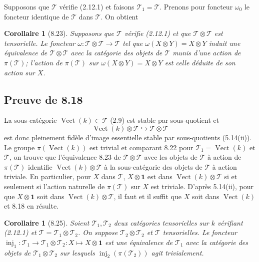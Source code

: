 \documentclass[12pt,a4paper]{article}
\theoremstyle{plain}
\newtheorem{corollary}[theorem]{Corollaire}
\theoremstyle{definition}
\DeclareMathOperator{\Vect}{Vect}
\DeclareMathOperator{\inj}{inj}
\begin{document}
Supposons que $\mathcal{T}$ vérifie (2.12.1) et faisons $\mathcal{T}_1 = \mathcal{T}$. Prenons pour foncteur $\omega_0$ le foncteur identique de $\mathcal{T}$ dans $\mathcal{T}$. On obtient
\begin{corollary}[8.23]
Supposons que $\mathcal{T}$ vérifie (2.12.1) et que $\mathcal{T} \otimes \mathcal{T}$ est tensorielle. Le foncteur $\omega : \mathcal{T} \otimes \mathcal{T} \to \mathcal{T}$ tel que $\omega(X \otimes Y) = X \otimes Y$ induit une équivalence de $\mathcal{T} \otimes \mathcal{T}$ avec la catégorie des objets de $\mathcal{T}$ munis d'une action de $\pi(\mathcal{T})$; l'action de $\pi(\mathcal{T})$ sur $\omega(X \otimes Y) = X \otimes Y$ est celle déduite de son action sur $X$.
\end{corollary}

\subsection{Preuve de 8.18}

La sous-catégorie $\Vect(k) \subset \mathcal{T}$ (2.9) est stable par sous-quotient et
\[
\Vect(k) \otimes \mathcal{T} \hookrightarrow \mathcal{T} \otimes \mathcal{T}
\]
est donc pleinement fidèle d'image essentielle stable par sous-quotients (5.14(ii)). Le groupe $\pi(\Vect(k))$ est trivial et comparant 8.22 pour $\mathcal{T}_1 = \Vect(k)$ et $\mathcal{T}$, on trouve que l'équivalence 8.23 de $\mathcal{T} \otimes \mathcal{T}$ avec les objets de $\mathcal{T}$ à action de $\pi(\mathcal{T})$ identifie $\Vect(k) \otimes \mathcal{T}$ à la sous-catégorie des objets de $\mathcal{T}$ à action triviale. En particulier, pour $X$ dans $\mathcal{T}$, $X \otimes \mathbf{1}$ est dans $\Vect(k) \otimes \mathcal{T}$ si et seulement si l'action naturelle de $\pi(\mathcal{T})$ sur $X$ est triviale. D'après 5.14(ii), pour que $X \otimes \mathbf{1}$ soit dans $\Vect(k) \otimes \mathcal{T}$, il faut et il suffit que $X$ soit dans $\Vect(k)$ et 8.18 en résulte.

\begin{corollary}[8.25]
Soient $\mathcal{T}_1, \mathcal{T}_2$ deux catégories tensorielles sur $k$ vérifiant (2.12.1) et $\mathcal{T} = \mathcal{T}_1 \otimes \mathcal{T}_2$. On suppose $\mathcal{T}_2 \otimes \mathcal{T}_2$ et $\mathcal{T}$ tensorielles. Le foncteur $\inj_1 : \mathcal{T}_1 \to \mathcal{T}_1 \otimes \mathcal{T}_2 : X \mapsto X \otimes \mathbf{1}$ est une équivalence de $\mathcal{T}_1$ avec la catégorie des objets de $\mathcal{T}_1 \otimes \mathcal{T}_2$ sur lesquels $\inj_2(\pi(\mathcal{T}_2))$ agit trivialement.
\end{corollary}
\end{document}
